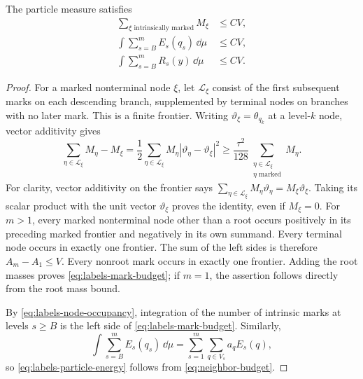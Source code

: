 \begin{lemma}
\label{lem:labels-switch-packing}
The particle measure satisfies
\begin{align}
 \sum_{\xi\text{ intrinsically marked}}M_\xi&\le C V,
 \label{eq:labels-mark-budget}\\
 \int\sum_{s=B}^m E_s(q_s)\,\dd\mu&\le C V,
 \label{eq:labels-particle-energy}\\
 \int\sum_{s=B}^m R_s(y)\,\dd\mu&\le C V.
 \label{eq:labels-particle-switches}
\end{align}
\end{lemma}

\begin{proof}
For a marked nonterminal node $\xi$, let $\mathcal L_\xi$ consist of
the first subsequent marks on each descending branch, supplemented by
terminal nodes on branches with no later mark. This is a finite frontier.
Writing $\vartheta_\xi=\theta_{q_k}$ at a level-$k$ node, vector additivity
gives
\begin{equation}
 \sum_{\eta\in\mathcal L_\xi}M_\eta-M_\xi
 =\frac12\sum_{\eta\in\mathcal L_\xi}M_\eta
                   |\vartheta_\eta-\vartheta_\xi|^2
 \ge\frac{\tau^2}{128}
          \sum_{\substack{\eta\in\mathcal L_\xi\\\eta\text{ marked}}}
                   M_\eta.
 \label{eq:labels-stopped-defect}
\end{equation}
For clarity, vector additivity on the frontier says
$\sum_{\eta\in\mathcal L_\xi}M_\eta\vartheta_\eta
=M_\xi\vartheta_\xi$. Taking its scalar product with the unit vector
$\vartheta_\xi$ proves the identity, even if $M_\xi=0$.
For $m>1$, every marked nonterminal node other than a root occurs positively
in its preceding marked frontier and negatively in its own
summand. Every terminal node occurs in exactly one frontier.
The sum of the left sides is therefore $A_m-A_1\le V$. Every nonroot mark
occurs in exactly one frontier. Adding the root masses proves
\eqref{eq:labels-mark-budget}; if $m=1$, the assertion follows directly
from the root mass bound.

By \eqref{eq:labels-node-occupancy}, integration of the number of intrinsic
marks at levels $s\ge B$ is the left side of
\eqref{eq:labels-mark-budget}. Similarly,
\[
 \int\sum_{s=B}^m E_s(q_s)\,\dd\mu
 =\sum_{s=1}^m\sum_{q\in V_s}a_q E_s(q),
\]
so \eqref{eq:labels-particle-energy} follows from
\eqref{eq:neighbor-budget}.


\end{proof}
